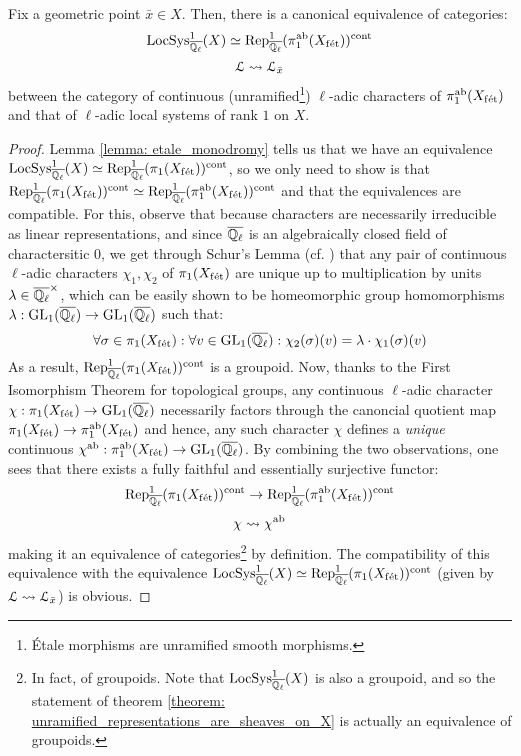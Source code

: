         \begin{theorem} \label{theorem: unramified_representations_are_sheaves_on_X}
            Fix a geometric point $\bar{x} \in X$. Then, there is a canonical equivalence of categories:
                $$\mathrm{LocSys}^1_{\overline{\mathbb{Q}_{\ell}}}(X) \simeq \mathrm{Rep}^1_{\overline{\mathbb{Q}_{\ell}}}(\pi_1^{\mathrm{ab}}(X_{\mathrm{f\acute{e}t}}))^{\mathrm{cont}}$$
                $$\mathcal{L} \leadsto \mathcal{L}_{\bar{x}}$$
            between the category of continuous (unramified\footnote{\'Etale morphisms are unramified smooth morphisms.}) $\ell$-adic characters of $\pi_1^{\mathrm{ab}}(X_{\mathrm{f\acute{e}t}})$ and that of $\ell$-adic local systems of rank $1$ on $X$.
        \end{theorem}
            \begin{proof}
                Lemma \ref{lemma: etale_monodromy} tells us that we have an equivalence $\mathrm{LocSys}^1_{\overline{\mathbb{Q}_{\ell}}}(X) \simeq \mathrm{Rep}^1_{\overline{\mathbb{Q}_{\ell}}}(\pi_1(X_{\mathrm{f\acute{e}t}}))^{\mathrm{cont}}$, so we only need to show is that $\mathrm{Rep}^1_{\overline{\mathbb{Q}_{\ell}}}(\pi_1(X_{\mathrm{f\acute{e}t}}))^{\mathrm{cont}} \simeq \mathrm{Rep}^1_{\overline{\mathbb{Q}_{\ell}}}(\pi_1^{\mathrm{ab}}(X_{\mathrm{f\acute{e}t}}))^{\mathrm{cont}}$ and that the equivalences are compatible. For this, observe that because characters are necessarily irreducible as linear representations, and since $\overline{\mathbb{Q}_{\ell}}$ is an algebraically closed field of charactersitic $0$, we get through Schur's Lemma (cf. \cite[Lemma 3.6, pp. 35]{lam_first_course_in_noncommutative_rings}) that any pair of continuous $\ell$-adic characters $\chi_1, \chi_2$ of $\pi_1(X_{\mathrm{f\acute{e}t}})$ are unique up to multiplication by units $\lambda \in \overline{\Q_{\ell}}^{\x}$, which can be easily shown to be homeomorphic group homomorphisms $\lambda: \operatorname{GL}_1(\overline{\mathbb{Q}_{\ell}}) \to \operatorname{GL}_1(\overline{\mathbb{Q}_{\ell}})$ such that:
                    $$\forall \sigma \in \pi_1(X_{\mathrm{f\acute{e}t}}): \forall v \in \operatorname{GL}_1(\overline{\mathbb{Q}_{\ell}}): \chi_2(\sigma)(v) = \lambda \cdot \chi_1(\sigma)(v)$$
                As a result, $\mathrm{Rep}^1_{\overline{\mathbb{Q}_{\ell}}}(\pi_1(X_{\mathrm{f\acute{e}t}}))^{\mathrm{cont}}$ is a groupoid. Now, thanks to the First Isomorphism Theorem for topological groups, any continuous $\ell$-adic character $\chi: \pi_1(X_{\mathrm{f\acute{e}t}}) \to \operatorname{GL}_1(\overline{\mathbb{Q}_{\ell}})$ necessarily factors through the canoncial quotient map $\pi_1(X_{\mathrm{f\acute{e}t}}) \to \pi_1^{\mathrm{ab}}(X_{\mathrm{f\acute{e}t}})$ and hence, any such character $\chi$ defines a \textit{unique} continuous  $\chi^{\mathrm{ab}}: \pi_1^{\mathrm{ab}}(X_{\mathrm{f\acute{e}t}}) \to \operatorname{GL}_1(\overline{\mathbb{Q}_{\ell}})$. By combining the two observations, one sees that there exists a fully faithful and essentially surjective functor:
                    $$\mathrm{Rep}^1_{\overline{\mathbb{Q}_{\ell}}}(\pi_1(X_{\mathrm{f\acute{e}t}}))^{\mathrm{cont}} \to \mathrm{Rep}^1_{\overline{\mathbb{Q}_{\ell}}}(\pi_1^{\mathrm{ab}}(X_{\mathrm{f\acute{e}t}}))^{\mathrm{cont}}$$
                    $$\chi \leadsto \chi^{\mathrm{ab}}$$
                making it an equivalence of categories\footnote{In fact, of groupoids. Note that $\mathrm{LocSys}_{\overline{\mathbb{Q}_{\ell}}}^1(X)$ is also a groupoid, and so the statement of theorem \ref{theorem: unramified_representations_are_sheaves_on_X} is actually an equivalence of groupoids.} by definition. The compatibility of this equivalence with the equivalence $\mathrm{LocSys}^1_{\overline{\mathbb{Q}_{\ell}}}(X) \simeq \mathrm{Rep}^1_{\overline{\mathbb{Q}_{\ell}}}(\pi_1(X_{\mathrm{f\acute{e}t}}))^{\mathrm{cont}}$ (given by $\mathcal{L} \leadsto \mathcal{L}_{\bar{x}}$) is obvious.
            \end{proof}
